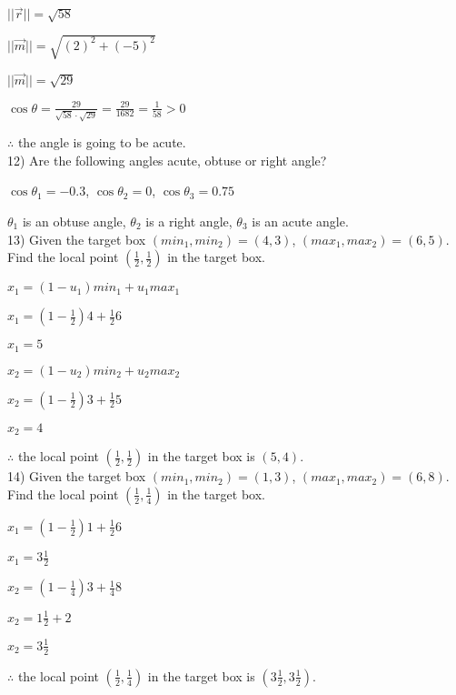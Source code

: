 \documentclass[a4paper]{article}
\begin{document}
$||\vec{r}|| = \sqrt{58}$

$||\vec{m}|| = \sqrt{(2)^2 + (-5)^2}$

$||\vec{m}|| = \sqrt{29}$

$\cos\theta = \frac{29}{\sqrt{58}\cdot\sqrt{29}} = \frac{29}{1682} = \frac{1}{58} > 0$

$\therefore$ the angle is going to be acute.\\

12) Are the following angles acute, obtuse or right angle?

$\cos\theta_1 = -0.3$, $\cos\theta_2 = 0$, $\cos\theta_3 = 0.75$

$\theta_1$ is an obtuse angle, $\theta_2$ is a right angle, $\theta_3$ is an acute angle.\\

13) Given the target box $(min_1, min_2) = (4,3)$, $(max_1, max_2) = (6,5)$. Find the local point $(\frac{1}{2}, \frac{1}{2})$ in the target box.

$x_1 = (1 - u_1)min_1 + u_1max_1$

$x_1 = (1 - \frac{1}{2})4 + \frac{1}{2}6$

$x_1 = 5$

$x_2 = (1-u_2)min_2 + u_2max_2$

$x_2 = (1-\frac{1}{2})3+\frac{1}{2}5$

$x_2 = 4$

$\therefore$ the local point $(\frac{1}{2},\frac{1}{2})$ in the target box is $(5,4)$.\\

14) Given the target box $(min_1, min_2) = (1,3)$, $(max_1, max_2) = (6,8)$. Find the local point $(\frac{1}{2},\frac{1}{4})$ in the target box.

$x_1 = (1 - \frac{1}{2})1+\frac{1}{2}6$

$x_1 = 3\frac{1}{2}$

$x_2 = (1-\frac{1}{4})3+\frac{1}{4}8$

$x_2 = 1\frac{1}{2}+2$

$x_2 = 3\frac{1}{2}$

$\therefore$ the local point $(\frac{1}{2},\frac{1}{4})$ in the target box is $(3\frac{1}{2}, 3\frac{1}{2})$.\\
\end{document}
